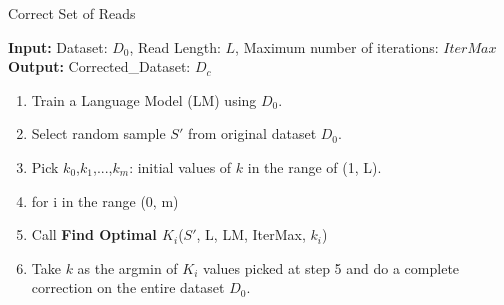 \begin{minipage}[t]{.45\textwidth}
\begin{algorithm}[H]
\caption{Correct Set of Reads}
\begin{flushleft}
\textbf{Input:} Dataset: $D_{0}$, Read Length: $L$, Maximum number of iterations: $IterMax$ \\
\textbf{Output:} Corrected\_Dataset: $D_c$ 
\end{flushleft}

\begin{algorithmic} 
\begin{enumerate}
\item Train a Language Model (LM) using $D_{0}$.
\item Select random sample $S'$ from original dataset $D_{0}$.
\item Pick $k_0$,$k_1$,...,$k_m$: initial values of $k$ in the range of (1, L).
\item for i in the range (0, m) 
\item \quad Call \textbf{Find Optimal $K_i$}($S'$, L, LM, IterMax, $k_i$)
\item Take $k$ as the argmin of $K_i$ values picked at step 5 and do a complete correction on the entire dataset $D_0$.
\end{enumerate}
\end{algorithmic}
\end{algorithm}
\end{minipage}
\hfill
